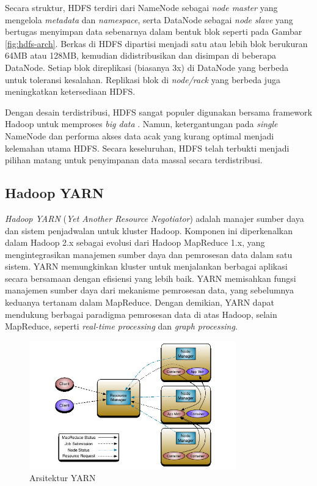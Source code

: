 Secara struktur, HDFS terdiri dari NameNode sebagai \textit{node master} yang mengelola \textit{metadata} dan \textit{namespace}, serta DataNode sebagai \textit{node slave} yang bertugas menyimpan data sebenarnya dalam bentuk blok seperti pada Gambar \ref{fig:hdfs-arch}. Berkas di HDFS dipartisi menjadi satu atau lebih blok berukuran 64MB atau 128MB, kemudian didistribusikan dan disimpan di beberapa DataNode. Setiap blok direplikasi (biasanya 3x) di DataNode yang berbeda untuk toleransi kesalahan. Replikasi blok di \textit{node/rack} yang berbeda juga meningkatkan ketersediaan HDFS.

Dengan desain terdistribusi, HDFS sangat populer digunakan bersama framework Hadoop untuk memproses \textit{big data} \cite{almansouriHadoopDistributedFile2019}. Namun, ketergantungan pada \textit{single} NameNode dan performa akses data acak yang kurang optimal menjadi kelemahan utama HDFS. Secara keseluruhan, HDFS telah terbukti menjadi pilihan matang untuk penyimpanan data massal secara terdistribusi.

\subsection{Hadoop YARN}
\textit{Hadoop YARN} (\textit{Yet Another Resource Negotiator}) adalah manajer sumber daya dan sistem penjadwalan untuk kluster Hadoop. Komponen ini diperkenalkan dalam Hadoop 2.x sebagai evolusi dari Hadoop MapReduce 1.x, yang mengintegrasikan manajemen sumber daya dan pemrosesan data dalam satu sistem. YARN memungkinkan kluster untuk menjalankan berbagai aplikasi secara bersamaan dengan efisiensi yang lebih baik.  YARN memisahkan fungsi manajemen sumber daya dari mekanisme pemrosesan data, yang sebelumnya keduanya tertanam dalam MapReduce. Dengan demikian, YARN dapat mendukung berbagai paradigma pemrosesan data di atas Hadoop, selain MapReduce, seperti \textit{real-time processing} dan \textit{graph processing}.

\begin{figure}[h!]
    \centering
    \includegraphics[width=0.8\textwidth]{figures/ch02/yarn-arch}
    \caption{Arsitektur YARN \cite{ApacheHadoopApache}}
    \label{fig:yarn_arch}
\end{figure}

